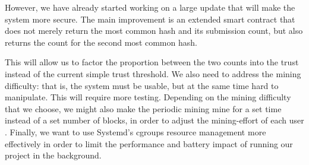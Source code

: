 However, we have already started working on a large update that will make the system more secure.
The main improvement is an extended smart contract that does not merely return the most common hash and its submission count, but also returns the count for the second most common hash.

This will allow us to factor the proportion between the two counts into the trust instead of the current simple trust threshold.
We also need to address the mining difficulty: that is, the system must be usable, but at the same time hard to manipulate. This will require more testing.
Depending on the mining difficulty that we choose, we might also make the periodic mining mine for a set time instead of a set number of blocks, in order to adjust the mining-effort of each user .
Finally, we want to use Systemd's cgroups resource management more effectively in order to limit the performance and battery impact of running our project in the background.
